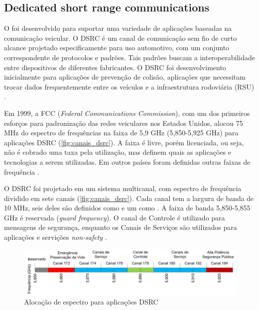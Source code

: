 \documentclass[mestrado, pre-defesa, english, brazil]{packages/icmc}
\begin{document}
\subsection{Dedicated short range communications} \label{dsrc}

O  foi desenvolvido para suportar uma variedade de aplicações baseadas na comunicação veicular. O DSRC é um canal de comunicação sem fio de curto alcance projetado especificamente para uso automotivo, com um conjunto correspondente de protocolos e padrões. Tais padrões buscam a interoperabilidade entre dispositivos de diferentes fabricantes. O  DSRC foi desenvolvimento inicialmente para aplicações de prevenção de colisão, aplicações que necessitam trocar dados frequentemente entre os veículos e a infraestrutura rodoviária (RSU) \cite{kenney-2011,Alves-2009}.

Em 1999, a FCC (\textit{Federal Communications Commission}), com um dos primeiros esforços para padronização das redes veiculares nos Estados Unidos, alocou 75 MHz do espectro de frequências na faixa de 5,9 GHz (5,850-5,925 GHz) para aplicações DSRC (\autoref{fig:canais_dsrc}). A faixa é livre, porém licenciada, ou seja, não é cobrado uma taxa pela utilização, mas definem quais as aplicações e tecnologias a serem utilizadas. Em outros países foram definidas outras faixas de frequência \cite{Alves-2009,li-2012,kenney-2011}.

O DSRC foi projetado em um sistema multicanal, com espectro de frequência dividido em sete canais (\autoref{fig:canais_dsrc}). Cada canal tem a largura de banda de 10 MHz, seis deles são definidos como  e um como . A faixa de banda 5,850-5,855 GHz é reservada (\textit{guard frequency}). O canal de Controle é utilizado para mensagens de segurança, enquanto os Canais de Serviços são utilizados para aplicações e servições \textit{non-safety} \cite{sattari-2012,li-2012}.

\begin{figure}[!htbp]
	\centering
	\caption{\label{fig:canais_dsrc} Alocação de espectro para aplicações DSRC}
	\includegraphics[width=15cm]{img/canais-dsrc2.jpeg}
\end{figure}
\end{document}
